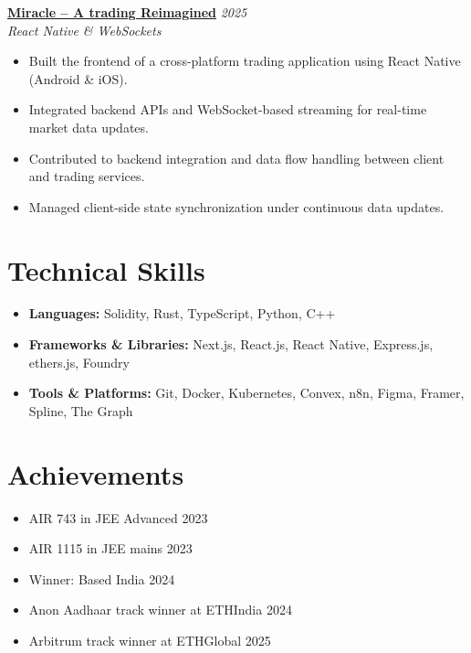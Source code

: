 \documentclass[10pt,a4paper]{article}
\newcommand{\resumeEntry}[3]{
  \noindent\textbf{#1} \hfill \textit{#2} \\   
  \textit{#3} \vspace{-3pt}
}
\newcommand{\entryGap}{\vspace{5pt}}
\begin{document}
\entryGap

\resumeEntry{\href{https://apps.apple.com/in/app/miracle-trading-reimagined/id6757129362}{Miracle -- A trading Reimagined}}{2025}{React Native \& WebSockets}

\begin{itemize}
    \item Built the frontend of a cross-platform trading application using React Native (Android \& iOS).
    \item Integrated backend APIs and WebSocket-based streaming for real-time market data updates.
    \item Contributed to backend integration and data flow handling between client and trading services.
    \item Managed client-side state synchronization under continuous data updates.
\end{itemize}

\section{Technical Skills}
\begin{itemize}[leftmargin=0pt, label={}]
    \item \textbf{Languages:} Solidity, Rust, TypeScript, Python, C++
    \item \textbf{Frameworks \& Libraries:} Next.js, React.js, React Native, Express.js, ethers.js, Foundry
    \item \textbf{Tools \& Platforms:} Git, Docker, Kubernetes, Convex, n8n, Figma, Framer, Spline, The Graph
\end{itemize}

\section{Achievements}
\begin{itemize}
    \item AIR 743 in JEE Advanced 2023
    \item AIR 1115 in JEE mains 2023
    \item Winner: Based India 2024
    \item Anon Aadhaar track winner at ETHIndia 2024
    \item Arbitrum track winner at ETHGlobal 2025
\end{itemize}
\end{document}
